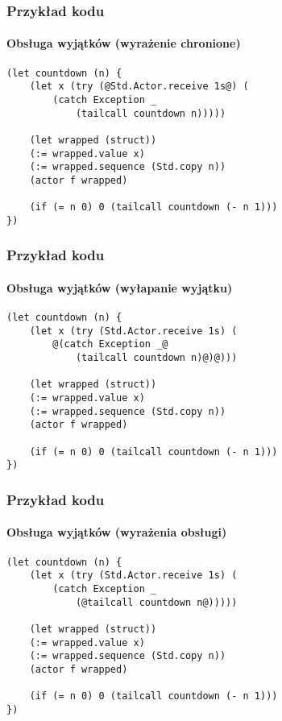 \documentclass{beamer}
\begin{document}
\begin{frame}[fragile]
    \frametitle{Przykład kodu}
    \framesubtitle{Obsługa wyjątków (wyrażenie chronione)}

    \begin{small}
    \begin{lstlisting}
(let countdown (n) {
    (let x (try (@Std.Actor.receive 1s@) (
        (catch Exception _
            (tailcall countdown n)))))

    (let wrapped (struct))
    (:= wrapped.value x)
    (:= wrapped.sequence (Std.copy n))
    (actor f wrapped)

    (if (= n 0) 0 (tailcall countdown (- n 1)))
})
    \end{lstlisting}
    \end{small}
\end{frame}

\begin{frame}[fragile]
    \frametitle{Przykład kodu}
    \framesubtitle{Obsługa wyjątków (wyłapanie wyjątku)}

    \begin{small}
    \begin{lstlisting}
(let countdown (n) {
    (let x (try (Std.Actor.receive 1s) (
        @(catch Exception _@
            (tailcall countdown n)@)@)))

    (let wrapped (struct))
    (:= wrapped.value x)
    (:= wrapped.sequence (Std.copy n))
    (actor f wrapped)

    (if (= n 0) 0 (tailcall countdown (- n 1)))
})
    \end{lstlisting}
    \end{small}
\end{frame}

\begin{frame}[fragile]
    \frametitle{Przykład kodu}
    \framesubtitle{Obsługa wyjątków (wyrażenia obsługi)}

    \begin{small}
    \begin{lstlisting}
(let countdown (n) {
    (let x (try (Std.Actor.receive 1s) (
        (catch Exception _
            (@tailcall countdown n@)))))

    (let wrapped (struct))
    (:= wrapped.value x)
    (:= wrapped.sequence (Std.copy n))
    (actor f wrapped)

    (if (= n 0) 0 (tailcall countdown (- n 1)))
})
    \end{lstlisting}
    \end{small}
\end{frame}
\end{document}
